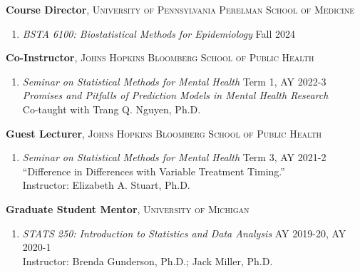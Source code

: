 \documentclass[letterpaper,11pt]{article} %
\begin{document}
		\textbf{Course Director}, \textsc{University of Pennsylvania Perelman School of Medicine}
		\begin{enumerate}
			\item[] \textit{BSTA 6100: Biostatistical Methods for Epidemiology} \hfill Fall 2024
		\end{enumerate}
	
		\noindent \textbf{Co-Instructor}, \textsc{Johns Hopkins Bloomberg School of Public Health}
		\begin{enumerate}
			\item[] \textit{Seminar on Statistical Methods for Mental Health} \hfill Term 1, AY 2022-3 \\
			\textit{Promises and Pitfalls of Prediction Models in Mental Health Research} \\
			Co-taught with Trang Q. Nguyen, Ph.D.
		\end{enumerate}
		
		\noindent \textbf{Guest Lecturer}, \textsc{Johns Hopkins Bloomberg School of Public Health}
		\begin{enumerate}
			\item[] \textit{Seminar on Statistical Methods for Mental Health} \hfill Term 3, AY 2021-2 \\
			``Difference in Differences with Variable Treatment Timing.'' \\
			Instructor: Elizabeth A. Stuart, Ph.D.
		\end{enumerate}
		
 		\noindent \textbf{Graduate Student Mentor}, \textsc{University of Michigan} 
 		\begin{enumerate}
 			\item \textit{STATS 250: Introduction to Statistics and Data Analysis} \hfill AY 2019-20, AY 2020-1 \\
 			Instructor: Brenda Gunderson, Ph.D.; Jack Miller, Ph.D.
 		\end{enumerate}
	
\end{document}
